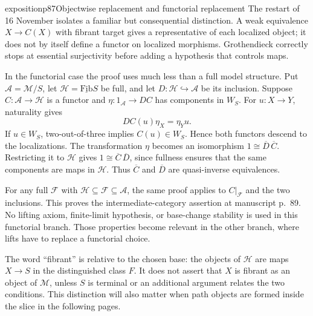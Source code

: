 \begin{dcomment}{exposition}{p87}{Objectwise replacement and functorial replacement}
The restart of 16 November isolates a familiar but consequential distinction. A weak equivalence $X\to C(X)$ with fibrant target gives a representative of each localized object; it does not by itself define a functor on localized morphisms. Grothendieck correctly stops at essential surjectivity before adding a hypothesis that controls maps.

In the functorial case the proof uses much less than a full model structure. Put $\mathcal A=\mathcal M/S$, let $\mathcal H=\underline{\mathrm{Fib}}S$ be full, and let $D:\mathcal H\hookrightarrow\mathcal A$ be its inclusion. Suppose $C:\mathcal A\to\mathcal H$ is a functor and $\eta:1_{\mathcal A}\to DC$ has components in $W_S$. For $u:X\to Y$, naturality gives
\[
 DC(u)\eta_X=\eta_Yu.
\]
If $u\in W_S$, two-out-of-three implies $C(u)\in W_S$. Hence both functors descend to the localizations. The transformation $\eta$ becomes an isomorphism $1\cong\overline D\,\overline C$. Restricting it to $\mathcal H$ gives $1\cong\overline C\,\overline D$, since fullness ensures that the same components are maps in $\mathcal H$. Thus $\overline C$ and $\overline D$ are quasi-inverse equivalences.

For any full $\mathcal F$ with $\mathcal H\subseteq\mathcal F\subseteq\mathcal A$, the same proof applies to $C|_{\mathcal F}$ and the two inclusions. This proves the intermediate-category assertion at manuscript p.~89. No lifting axiom, finite-limit hypothesis, or base-change stability is used in this functorial branch. Those properties become relevant in the other branch, where lifts have to replace a functorial choice.

The word ``fibrant'' is relative to the chosen base: the objects of $\mathcal H$ are maps $X\to S$ in the distinguished class $F$. It does not assert that $X$ is fibrant as an object of $\mathcal M$, unless $S$ is terminal or an additional argument relates the two conditions. This distinction will also matter when path objects are formed inside the slice in the following pages.
\end{dcomment}

